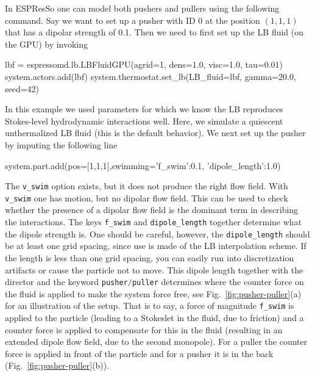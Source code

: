 \documentclass[aip,jcp,reprint,a4paper,onecolumn,amsmath]{revtex4-1}
\newcommand{\es}{\mbox{\textsf{ESPResSo}}\xspace}
\newcommand\codees{\lstinline[language=python]}
\begin{document}
In \es{} one can model both pushers and pullers using the following command.
Say we want to set up a pusher with ID 0 at the position $(1,1,1)$ that has a
dipolar strength of 0.1. Then we need to first set up the LB fluid (on the GPU)
by invoking
\begin{espresso}
lbf = espressomd.lb.LBFluidGPU(agrid=1, dens=1.0, visc=1.0, tau=0.01)
system.actors.add(lbf)
system.thermostat.set_lb(LB_fluid=lbf, gamma=20.0, seed=42)
\end{espresso}
In this example we used parameters for which we know the LB reproduces
Stokes-level hydrodynamic interactions well. Here, we simulate a
quiescent unthermalized LB fluid (this is the default
behavior). We next set up the pusher by imputing the following line
\begin{espresso}
system.part.add(pos=[1,1,1],swimming={'f_swim':0.1, 'dipole_length':1.0})
\end{espresso}
The \codees{v_swim} option exists, but it does not produce the right flow
field. With \codees{v_swim} one has motion, but no dipolar flow field. This can
be used to check whether the presence of a dipolar flow field is the dominant
term in describing the interactions. The keys \codees{f_swim} and
\codees{dipole_length} together determine what the dipole strength is. One
should be careful, however, the \codees{dipole_length} should be at least one
grid spacing, since use is made of the LB interpolation scheme. If the length
is less than one grid spacing, you can easily run into discretization artifacts
or cause the particle not to move. This dipole length together with the
director and the keyword \codees{pusher/puller} determines where the counter
force on the fluid is applied to make the system force free, see
Fig.~\ref{fig:pusher-puller}(a) for an illustration of the setup. That is to
say, a force of magnitude \codees{f_swim} is applied to the particle (leading
to a Stokeslet in the fluid, due to friction) and a counter force is applied to
compensate for this in the fluid (resulting in an extended dipole flow field,
due to the second monopole). For a puller the counter force is applied in front
of the particle and for a pusher it is in the back
(Fig.~\ref{fig:pusher-puller}(b)).
\end{document}
